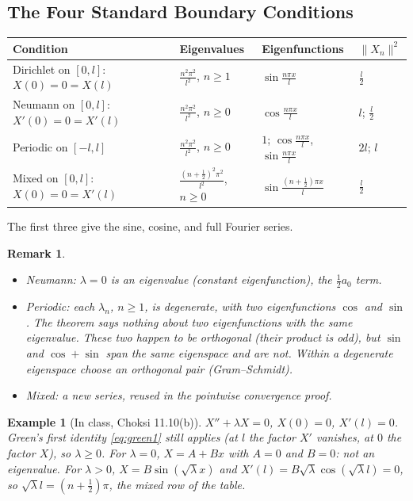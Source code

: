 \documentclass{article}
\newtheorem*{example}{Example}
\newtheorem{remark}{Remark}
\begin{document}
\subsection{The Four Standard Boundary Conditions}
\begin{center}
\small
\renewcommand{\arraystretch}{1.4}
\begin{tabular}{llll}
    Condition & Eigenvalues & Eigenfunctions & $\|X_n\|^2$ \\
    \hline
    Dirichlet on $[0,l]$: $X(0) = 0 = X(l)$ & $\frac{n^2\pi^2}{l^2}$, $n\geq1$ & $\sin\frac{n\pi x}{l}$ & $\frac{l}{2}$ \\
    Neumann on $[0,l]$: $X'(0) = 0 = X'(l)$ & $\frac{n^2\pi^2}{l^2}$, $n\geq0$ & $\cos\frac{n\pi x}{l}$ & $l$; $\frac{l}{2}$ \\
    Periodic on $[-l,l]$ & $\frac{n^2\pi^2}{l^2}$, $n\geq0$ & $1$; $\cos\frac{n\pi x}{l}$, $\sin\frac{n\pi x}{l}$ & $2l$; $l$ \\
    Mixed on $[0,l]$: $X(0) = 0 = X'(l)$ & $\frac{(n+\frac12)^2\pi^2}{l^2}$, $n\geq0$ & $\sin\frac{(n+\frac12)\pi x}{l}$ & $\frac{l}{2}$
\end{tabular}
\end{center}
The first three give the sine, cosine, and full Fourier series.
\begin{remark}
    \leavevmode
    \begin{itemize}
        \item Neumann: $\lambda = 0$ is an eigenvalue (constant eigenfunction), the $\frac12a_0$ term.
        \item Periodic: each $\lambda_n$, $n \geq 1$, is \emph{degenerate}, with two eigenfunctions $\cos$ and $\sin$. The theorem says nothing about two eigenfunctions with the same eigenvalue. These two happen to be orthogonal (their product is odd), but $\sin$ and $\cos + \sin$ span the same eigenspace and are not. Within a degenerate eigenspace choose an orthogonal pair (Gram--Schmidt).
        \item Mixed: a new series, reused in the pointwise convergence proof.
    \end{itemize}
\end{remark}
\begin{example}[In class, Choksi 11.10(b)]
    $X'' + \lambda X = 0$, $X(0) = 0$, $X'(l) = 0$. Green's first identity \eqref{eq:green1} still applies (at $l$ the factor $X'$ vanishes, at $0$ the factor $X$), so $\lambda \geq 0$. For $\lambda = 0$, $X = A + Bx$ with $A = 0$ and $B = 0$: not an eigenvalue. For $\lambda > 0$, $X = B\sin(\sqrt\lambda x)$ and $X'(l) = B\sqrt\lambda\cos(\sqrt\lambda l) = 0$, so $\sqrt\lambda l = (n + \frac12)\pi$, the mixed row of the table.
\end{example}
\end{document}
